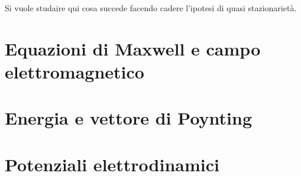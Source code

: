 Si vuole studaire qui cosa succede facendo cadere l'ipotesi di quasi stazionarietà.

\section{Equazioni di Maxwell e campo elettromagnetico}


\section{Energia e vettore di Poynting}


\section{Potenziali elettrodinamici}

